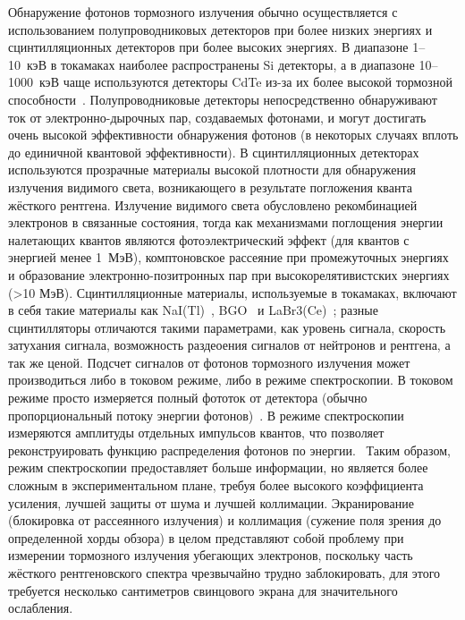 Обнаружение фотонов тормозного излучения обычно осуществляется с использованием полупроводниковых детекторов при более низких энергиях и сцинтилляционных детекторов при более высоких энергиях. В диапазоне 1--10~кэВ в токамаках наиболее распространены Si детекторы, а в диапазоне 10--1000~кэВ чаще используются детекторы CdTe из-за их более высокой тормозной способности~\cite{Esposito2003}. Полупроводниковые детекторы непосредственно обнаруживают ток от электронно-дырочных пар, создаваемых фотонами, и могут достигать очень высокой эффективности обнаружения фотонов (в некоторых случаях вплоть до единичной квантовой эффективности). В сцинтилляционных детекторах используются прозрачные материалы высокой плотности для обнаружения излучения видимого света, возникающего в результате погложения кванта жёсткого рентгена. Излучение видимого света обусловлено рекомбинацией электронов в связанные состояния, тогда как механизмами поглощения энергии налетающих квантов являются фотоэлектрический эффект (для квантов с энергией менее 1~МэВ), комптоновское рассеяние при промежуточных энергиях и образование электронно-позитронных пар при высокорелятивистских энергиях (>10 МэВ). Сцинтилляционные материалы, используемые в токамаках, включают в себя такие материалы как NaI(Tl)~\cite{Shevelev2004,Vlainic2015}, BGO~\cite{Shevelev2013,James2011} и LaBr3(Ce)~\cite{Shevelev2016,Nocente2010}; разные сцинтилляторы отличаются такими параметрами, как уровень сигнала, скорость затухания сигнала, возможность раздеоения сигналов от нейтронов и рентгена, а так же ценой. Подсчет сигналов от фотонов тормозного излучения может производиться либо в токовом режиме, либо в режиме спектроскопии. В токовом режиме просто измеряется полный фототок от детектора (обычно пропорциональный потоку энергии фотонов)~\cite{Savrukhin2002}. В режиме спектроскопии измеряются амплитуды отдельных импульсов квантов, что позволяет реконструировать функцию распределения фотонов по энергии.~\cite{Shevelev2013,Khilkevitch2013} Таким образом, режим спектроскопии предоставляет больше информации, но является более сложным в экспериментальном плане, требуя более высокого коэффициента усиления, лучшей защиты от шума и лучшей коллимации. Экранирование (блокировка от рассеянного излучения) и коллимация (сужение поля зрения до определенной хорды обзора) в целом представляют собой проблему при измерении тормозного излучения убегающих электронов, поскольку часть жёсткого рентгеновского спектра чрезвычайно трудно заблокировать, для этого требуется несколько сантиметров свинцового экрана для значительного ослабления.~\cite{Cooper2016,Breizman2019}


